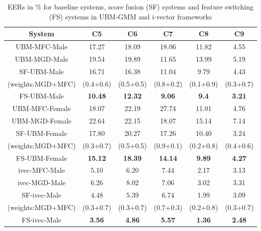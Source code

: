 \documentclass{article}
\begin{document}
\begin{table}[t]
	\centering
	\caption{EERs in \% for baseline systems, score fusion (SF) systems and feature switching (FS) systems in UBM-GMM and i-vector frameworks}
	\begin{tabular}{|c|c|c|c|c|c|} \hline
 {\bf System} & {\bf C5 } &  {\bf C6} & {\bf C7} & {\bf C8}  & {\bf C9  }\\ \hline \hline

UBM-MFC-Male & 17.27 & 18.09 & 18.06 & 11.82 & 4.55 \\ \hline

UBM-MGD-Male & 19.54 & 19.89 & 11.65 & 13.99 & 5.19 \\ \hline

SF-UBM-Male & 16.71 & 16.38 & 11.04 & 9.79 & 4.43 \\ 
(weights:MGD+MFC) & (0.4+0.6) & (0.5+0.5) & (0.8+0.2) & (0.1+0.9) & (0.3+0.7) \\ \hline

{FS-UBM-Male} & {\bf 10.48} & {\bf 12.32} & {\bf 9.06} & {\bf 9.4} & {\bf 3.21} \\  \hline

{UBM-MFC-Female} & 18.07 & 22.19 & 27.74 & 11.01 & 4.76 \\ \hline

{UBM-MGD-Female} & 22.64 & 22.15 & 18.07 & 15.14 & 7.14 \\ \hline

SF-UBM-Female & 17.80 & 20.27 & 17.26 & 10.40 & 3.24 \\ 
(weights:MGD+MFC) & (0.3+0.7) & (0.5+0.5) & (0.9+0.1) & (0.2+0.8) & (0.4+0.6) \\ \hline

{FS-UBM-Female} & {\bf 15.12 } & {\bf 18.39} & {\bf 14.14} & {\bf 9.89} & {\bf 4.27} \\ \hline

{ivec-MFC-Male} & 5.10 & 6.20 & 7.44 & 2.17 & 3.13 \\ \hline

{ivec-MGD-Male} &  6.26 & 8.02 & 7.06 & 3.02 & 3.31  \\ \hline

SF-ivec-Male & 4.48 & 5.39 & 6.74 & 1.99 & 3.09 \\ 
(weights:MGD+MFC) & (0.3+0.7) & (0.3+0.7) & (0.7+0.3) & (0.2+0.8) & (0.3+0.7) \\ \hline

{FS-ivec-Male} & {\bf 3.56} & {\bf 4.86} & {\bf 5.57} & {\bf 1.36} & {\bf 2.48} \\ \hline


\end{tabular}
\end{table}
\end{document}
